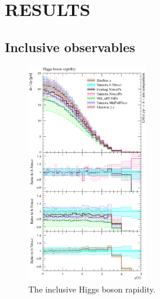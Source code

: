 \section{RESULTS}
\label{sec:hjetscomp:results}

\subsection{Inclusive observables}
\label{sec:hjetscomp:results:inclobs}

\begin{figure}[t!]
  \centering
  \includegraphics[width=0.47\textwidth]{figures/hjetscomp_H_y.pdf}
  \caption{
    The inclusive Higgs boson rapidity.
    \label{fig:higgscomp:results:inclobs:hy}
  }
\end{figure}

